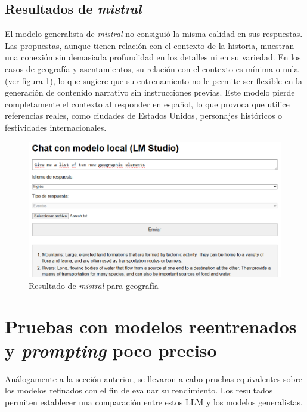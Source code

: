 \subsection{Resultados de \textit{mistral}}
El modelo generalista de \textit{mistral} no consiguió la misma calidad en sus respuestas.
Las propuestas, aunque tienen relación con el contexto de la historia,
muestran una conexión sin demasiada profundidad en los detalles ni en su variedad.
En los casos de geografía y asentamientos, su relación con el contexto es mínima o nula
(ver figura \ref{fig:mistral-geo}), lo que sugiere que su entrenamiento no le permite ser
flexible en la generación de contenido narrativo sin instrucciones previas.
Este modelo pierde completamente el contexto al responder en español,
lo que provoca que utilice referencias reales,
como ciudades de Estados Unidos, personajes históricos o festividades internacionales.

\begin{figure}[htbp]
	\centering
	\includegraphics[width=1\textwidth]{./Figures/mistral-noprompt-geography.png}
	\caption{Resultado de \textit{mistral} para geografía}
	\label{fig:mistral-geo}
\end{figure}

\section{Pruebas con modelos reentrenados y \textit{prompting} poco preciso}
Análogamente a la sección anterior, se llevaron a cabo pruebas equivalentes
sobre los modelos refinados con el fin de evaluar su rendimiento.
Los resultados permiten establecer una comparación entre estos LLM
y los modelos generalistas.

